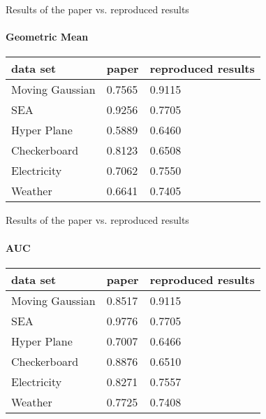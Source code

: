 
\begin{frame}{Results of the paper vs. reproduced results}
\framesubtitle{Geometric Mean}

\begin{table}[h]
    \centering
    \begin{tabular}{ | l | l | l | }
    \hline
    data set & paper & reproduced results \\ \hline \hline
    Moving Gaussian & 0.7565 & 0.9115 \\ \hline
    SEA & 0.9256 & 0.7705 \\ \hline
    Hyper Plane & 0.5889 & 0.6460 \\ \hline
    Checkerboard & 0.8123 & 0.6508 \\ \hline
    Electricity & 0.7062 & 0.7550 \\ \hline
    Weather & 0.6641 & 0.7405 \\ \hline
    \end{tabular}
\end{table}

\end{frame}


\begin{frame}{Results of the paper vs. reproduced results}
\framesubtitle{AUC}

\begin{table}[h]
    \centering
    \begin{tabular}{ | l | l | l | }
    \hline
    data set & paper & reproduced results \\ \hline \hline
    Moving Gaussian & 0.8517 & 0.9115 \\ \hline
    SEA & 0.9776 & 0.7705 \\ \hline
    Hyper Plane & 0.7007 & 0.6466 \\ \hline
    Checkerboard & 0.8876 & 0.6510 \\ \hline
    Electricity & 0.8271 & 0.7557 \\ \hline
    Weather & 0.7725 & 0.7408 \\ \hline
    \end{tabular}
\end{table}

\end{frame}

